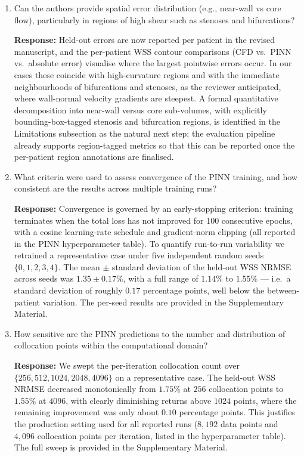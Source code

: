 \documentclass[11pt]{article}
\begin{document}
\begin{enumerate}[]
    \item Can the authors provide spatial error distribution (e.g., near-wall vs core flow), particularly in regions of high shear such as stenoses and bifurcations?

    \textbf{Response:} Held-out errors are now reported per patient in the revised manuscript, and the per-patient WSS contour comparisons (CFD vs.\ PINN vs.\ absolute error) visualise where the largest pointwise errors occur. In our cases these coincide with high-curvature regions and with the immediate neighbourhoods of bifurcations and stenoses, as the reviewer anticipated, where wall-normal velocity gradients are steepest. A formal quantitative decomposition into near-wall versus core sub-volumes, with explicitly bounding-box-tagged stenosis and bifurcation regions, is identified in the Limitations subsection as the natural next step; the evaluation pipeline already supports region-tagged metrics so that this can be reported once the per-patient region annotations are finalised.

    \item What criteria were used to assess convergence of the PINN training, and how consistent are the results across multiple training runs?

    \textbf{Response:} Convergence is governed by an early-stopping criterion: training terminates when the total loss has not improved for 100 consecutive epochs, with a cosine learning-rate schedule and gradient-norm clipping (all reported in the PINN hyperparameter table). To quantify run-to-run variability we retrained a representative case under five independent random seeds $\{0,1,2,3,4\}$. The mean $\pm$ standard deviation of the held-out WSS NRMSE across seeds was $1.35\pm0.17\%$, with a full range of $1.14\%$ to $1.55\%$ --- i.e.\ a standard deviation of roughly $0.17$ percentage points, well below the between-patient variation. The per-seed results are provided in the Supplementary Material.

    \item How sensitive are the PINN predictions to the number and distribution of collocation points within the computational domain?

    \textbf{Response:} We swept the per-iteration collocation count over $\{256,512,1024,2048,4096\}$ on a representative case. The held-out WSS NRMSE decreased monotonically from $1.75\%$ at $256$ collocation points to $1.55\%$ at $4096$, with clearly diminishing returns above $1024$ points, where the remaining improvement was only about $0.10$ percentage points. This justifies the production setting used for all reported runs ($8{,}192$ data points and $4{,}096$ collocation points per iteration, listed in the hyperparameter table). The full sweep is provided in the Supplementary Material.


\end{enumerate}
\end{document}
